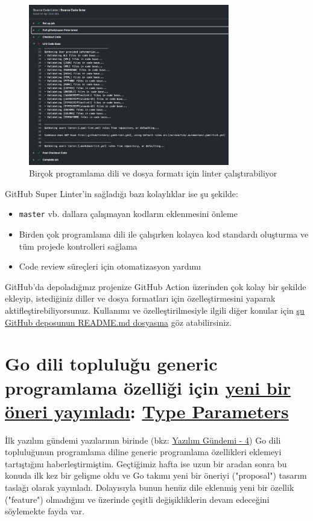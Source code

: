 \documentclass[11pt]{article}
\begin{document}
\begin{figure}[htbp]
\centering
\includegraphics[height=7cm]{gorseller/github-super-linter.png}
\caption{Birçok programlama dili ve dosya formatı için linter çalıştırabiliyor}
\end{figure}
\newpage

GitHub Super Linter'in sağladığı bazı kolaylıklar ise şu şekilde:

\begin{itemize}
\item \texttt{master} vb. dallara çalışmayan kodların eklenmesini önleme
\item Birden çok programlama dili ile çalışırken kolayca kod standardı oluşturma
ve tüm projede kontrolleri sağlama
\item Code review süreçleri için otomatizasyon yardımı
\end{itemize}

GitHub'da depoladığınız projenize GitHub Action üzerinden çok kolay bir
şekilde ekleyip, istediğiniz diller ve dosya formatları için özelleştirmesini
yaparak aktifleştirebiliyorsunuz. Kullanımı ve özelleştirilmesiyle ilgili
diğer konular için \href{https://github.blog/2020-06-18-introducing-github-super-linter-one-linter-to-rule-them-all/}{şu GitHub deposunun README.md dosyasına} göz atabilirsiniz.
\section{Go dili topluluğu generic programlama özelliği için \href{https://blog.golang.org/generics-next-step}{yeni bir öneri yayınladı}: \href{https://go.googlesource.com/proposal/+/refs/heads/master/design/go2draft-type-parameters.md}{Type Parameters}}
\label{sec:org01b6b71}
İlk yazılım gündemi yazılarının birinde (bkz: \href{../../2019/04/yazilim-gundemi-04.pdf}{Yazılım Gündemi - 4}) Go dili
topluluğunun programlama diline generic programlama özellikleri eklemeyi
tartıştığını haberleştirmiştim. Geçtiğimiz hafta ise uzun bir aradan sonra bu
konuda ilk kez bir gelişme oldu ve Go takımı yeni bir öneriyi ("proposal")
tasarım taslağı olarak yayınladı. Dolayısıyla bunun henüz dile eklenmiş yeni
bir özellik ("feature") olmadığını ve üzerinde çeşitli değişikliklerin devam
edeceğini söylemekte fayda var.
\end{document}
